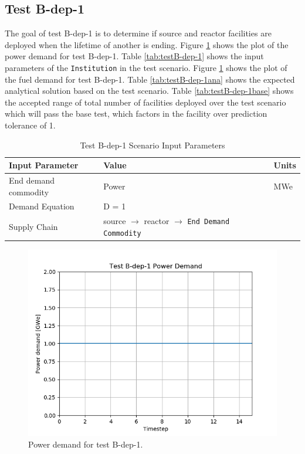 \documentclass[11pt,letterpaper]{article}
\begin{document}
\subsection{Test B-dep-1}
The goal of test B-dep-1 is to determine if source and reactor facilities are deployed when the lifetime of another is ending. Figure \ref{fig:B-dep-1} shows the plot of the power demand for test B-dep-1. 
Table \ref{tab:testB-dep-1} shows the input parameters of the \texttt{Institution} in the test scenario. Figure \ref{fig:B-dep-1} shows the plot of the fuel demand for test B-dep-1. 
Table \ref{tab:testB-dep-1ana} shows the expected analytical solution based on the test scenario. Table \ref{tab:testB-dep-1base} shows the accepted range of total number of facilities deployed over the test scenario which will pass the base test, which factors in the facility over prediction tolerance of 1. 

\begin{table}[H]
	\centering
	\caption{Test B-dep-1 Scenario Input Parameters }
	\label{tab:test_B-dep-1}
	\begin{tabular}{|l|l|l|}
		\hline
		\textbf{Input Parameter} & \textbf{Value} & \textbf{Units} \\
		\hline
		End demand commodity & Power & MWe \\
		Demand Equation & D = 1 & \\
		Supply Chain & source $\rightarrow$ reactor $\rightarrow$ \texttt{End Demand Commodity} &  \\
		\hline
	\end{tabular}
\end{table}

\begin{figure}[H]
	\begin{center}
		\includegraphics[scale=0.7]{./images/B-dep-1.png}
	\end{center}
	\caption{Power demand for test B-dep-1.}
	\label{fig:B-dep-1}
\end{figure}
\end{document}
